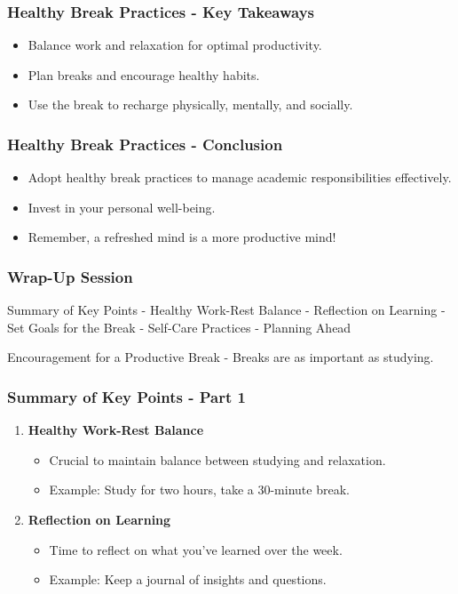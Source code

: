 \documentclass[aspectratio=169]{beamer}
\begin{document}
\begin{frame}[fragile]
  \frametitle{Healthy Break Practices - Key Takeaways}
  \begin{itemize}
    \item Balance work and relaxation for optimal productivity.
    \item Plan breaks and encourage healthy habits.
    \item Use the break to recharge physically, mentally, and socially.
  \end{itemize}
\end{frame}

\begin{frame}[fragile]
  \frametitle{Healthy Break Practices - Conclusion}
  \begin{itemize}
    \item Adopt healthy break practices to manage academic responsibilities effectively.
    \item Invest in your personal well-being.
    \item Remember, a refreshed mind is a more productive mind!
  \end{itemize}
\end{frame}

\begin{frame}[fragile]
  \frametitle{Wrap-Up Session}

  \begin{block}{Summary of Key Points}
    - Healthy Work-Rest Balance  
    - Reflection on Learning  
    - Set Goals for the Break  
    - Self-Care Practices  
    - Planning Ahead  
  \end{block}
  
  \begin{block}{Encouragement for a Productive Break}
    - Breaks are as important as studying.
  \end{block}
\end{frame}

\begin{frame}[fragile]
  \frametitle{Summary of Key Points - Part 1}
  \begin{enumerate}
    \item \textbf{Healthy Work-Rest Balance} 
    \begin{itemize}
      \item Crucial to maintain balance between studying and relaxation.
      \item Example: Study for two hours, take a 30-minute break.
    \end{itemize}

    \item \textbf{Reflection on Learning} 
    \begin{itemize}
      \item Time to reflect on what you've learned over the week.
      \item Example: Keep a journal of insights and questions.
    \end{itemize}
  \end{enumerate}
\end{frame}
\end{document}

